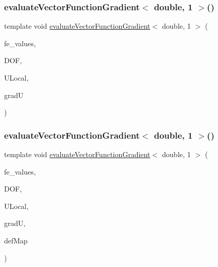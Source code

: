 \mbox{\label{function_evaluations_8cc_a960ffa13fae84ece6dc59bc0b91beea3}} 
\subsubsection{\texorpdfstring{evaluateVectorFunctionGradient$<$ double, 1 $>$()}{evaluateVectorFunctionGradient< double, 1 >()}\hspace{0.1cm}{\footnotesize\ttfamily [1/4]}}
{\footnotesize\ttfamily template void \mbox{\hyperlink{group___evaluation_functions_ga9608539d601a91aff1ba01ccc720fbe0}{evaluate\+Vector\+Function\+Gradient}}$<$ double, 1 $>$ (\begin{DoxyParamCaption}\item[{const F\+E\+Values$<$ 1 $>$ \&}]{fe\+\_\+values,  }\item[{unsigned int}]{D\+OF,  }\item[{Table$<$ 1, double $>$ \&}]{U\+Local,  }\item[{Table$<$ 3, double $>$ \&}]{gradU }\end{DoxyParamCaption})}

\mbox{\label{function_evaluations_8cc_a62dbc9fdef114b76a143e86bb1c6df96}} 
\subsubsection{\texorpdfstring{evaluateVectorFunctionGradient$<$ double, 1 $>$()}{evaluateVectorFunctionGradient< double, 1 >()}\hspace{0.1cm}{\footnotesize\ttfamily [2/4]}}
{\footnotesize\ttfamily template void \mbox{\hyperlink{group___evaluation_functions_ga9608539d601a91aff1ba01ccc720fbe0}{evaluate\+Vector\+Function\+Gradient}}$<$ double, 1 $>$ (\begin{DoxyParamCaption}\item[{const F\+E\+Values$<$ 1 $>$ \&}]{fe\+\_\+values,  }\item[{unsigned int}]{D\+OF,  }\item[{Table$<$ 1, double $>$ \&}]{U\+Local,  }\item[{Table$<$ 3, double $>$ \&}]{gradU,  }\item[{\mbox{\hyperlink{structdeformation_map}{deformation\+Map}}$<$ double, 1 $>$ \&}]{def\+Map }\end{DoxyParamCaption})}

